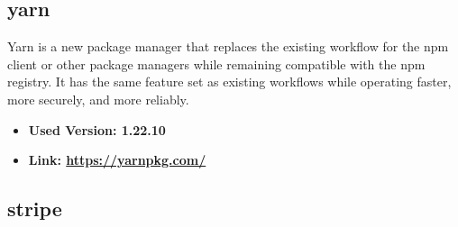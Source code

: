 \subsection{yarn}
Yarn is a new package manager that replaces the existing workflow for the npm client or other package managers while
remaining compatible with the npm registry. It has the same feature set as existing workflows while operating faster,
more securely, and more reliably.
\begin{itemize}
  \item \textbf{Used Version: 1.22.10}
  \item \textbf{Link: \url{https://yarnpkg.com/}}
\end{itemize}
\subsection{stripe}